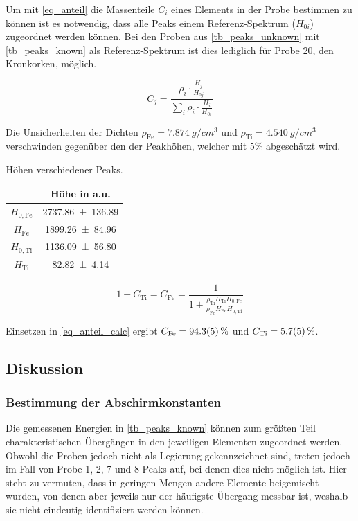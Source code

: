 \documentclass[
	a4paper,
	12pt,
	pagesize,
	ngerman
]{scrartcl}
\begin{document}
	Um mit \cref{eq_anteil} die Massenteile $C_i$ eines Elements in der Probe bestimmen zu können ist es notwendig, dass alle Peaks einem Referenz-Spektrum ($H_{0i}$) zugeordnet werden können.
	Bei den Proben aus \cref{tb_peaks_unknown} mit \cref{tb_peaks_known} als Referenz-Spektrum ist dies lediglich für Probe 20, den Kronkorken, möglich.
	
	\begin{equation}
		\label{eq_anteil}
		C_j = \frac{\rho_i \cdot \frac{H_j}{H_{0j}}}{\sum_{i} \rho_i \cdot \frac{H_i}{H_{0i}}}
	\end{equation}
	
	Die Unsicherheiten der Dichten $\rho_\text{Fe}=\SI{7.874}{g/cm^3}$ und $\rho_\text{Ti}=\SI{4.540}{g/cm^3}$ verschwinden gegenüber den der Peakhöhen, welcher mit 5\% abgeschätzt wird.
	
	\begin{table}[H]
		\centering
		\begin{tabular}{ c | c }
			 & Höhe in a.u.\\ \hline \hline
			$H_{0 , \text{Fe}}$ & \SI{2737.86+-136.89}{} \\	
			$H_{\text{Fe}}$ & \SI{1899.26+-84.96}{} \\	
			$H_{0 , \text{Ti}}$ & \SI{1136.09+-56.80}{} \\	
			$H_{\text{Ti}}$ & \SI{82.82+-4.14}{} \\	
		\end{tabular}
		\caption{Höhen verschiedener Peaks.} %
		\label{tb_peaks} 
	\end{table}	

	\begin{equation}
		\label{eq_anteil_calc}
		1-C_\text{Ti}= C_\text{Fe} = \frac{1}{1+ \frac{\rho_\text{Ti} H_\text{Ti} H_{0,\text{Fe}}}{\rho_\text{Fe} H_\text{Fe} H_{0,\text{Ti}}}}
	\end{equation}
	
	Einsetzen in \cref{eq_anteil_calc} ergibt $C_\text{Fe}=\SI{94.3+-0.5}{\%}$ und $C_\text{Ti}=\SI{5.7+-0.5}{\%}$.
	
	\subsection{Diskussion}
	\subsubsection{Bestimmung der Abschirmkonstanten}
	Die gemessenen Energien in \cref{tb_peaks_known} können zum größten Teil charakteristischen Übergängen in den jeweiligen Elementen zugeordnet werden.
	Obwohl die Proben jedoch nicht als Legierung gekennzeichnet sind, treten jedoch im Fall von Probe 1, 2, 7 und 8 Peaks auf, bei denen dies nicht möglich ist.
	Hier steht zu vermuten, dass in geringen Mengen andere Elemente beigemischt wurden, von denen aber jeweils nur der häufigste Übergang messbar ist, weshalb sie nicht eindeutig identifiziert werden können.
	
\end{document}
